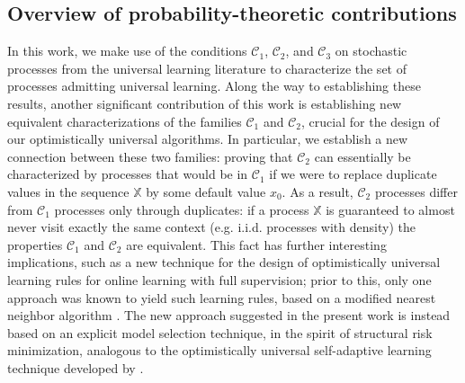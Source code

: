 \documentclass[aos]{imsart}
\theoremstyle{plain}
\theoremstyle{remark}
\newcommand{\Ccal}{\mathcal{C}}
\newcommand{\Xbb}{\mathbb{X}}
\newcommand{\1}{\mathbbm{1}}%
\newcommand{\ProcX}{\mathbb{X}}
\begin{document}
\subsection{Overview of probability-theoretic contributions}
In this work, we make use of the conditions $\Ccal_1$, $\Ccal_2$, and $\Ccal_3$ on stochastic processes from the universal learning literature to characterize the set of processes admitting universal learning. Along the way to establishing these results, another significant contribution of this work 
is establishing new equivalent characterizations of the families $\Ccal_1$ and $\Ccal_2$, crucial for the design of our optimistically universal algorithms.
In particular, we establish a new connection between these two families: 
proving that $\Ccal_2$ can essentially be characterized by processes that would be in $\Ccal_1$ 
if we were to replace duplicate values in the sequence $\ProcX$ by some default value $x_0$. As a result, $\Ccal_2$ processes differ from $\Ccal_1$ processes only through duplicates: if a process $\Xbb$ is guaranteed to almost never visit exactly the same context (e.g. i.i.d. processes with density) the properties $\Ccal_1$ and $\Ccal_2$ are equivalent. 
This fact has further interesting implications, such as a new technique for the design of 
optimistically universal learning rules for online learning with full supervision; prior to this, 
only one approach was known to yield such learning rules, based on a modified nearest neighbor algorithm \cite{blanchard:22a}.
The new approach suggested in the present work is instead based on an explicit model selection 
technique, in the spirit of structural risk minimization, analogous to the optimistically universal 
self-adaptive learning technique developed by \citep*{hanneke:21}. 
\end{document}
